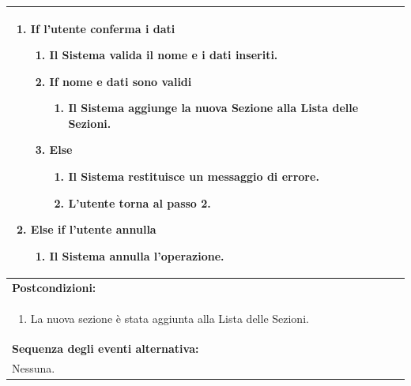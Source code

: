 \documentclass{article}
\begin{document}
\begin{table}[H]
\begin{tabular}{|p{\linewidth}|}
\begin{enumerate}
                            \item \textbf{If} l'utente conferma i dati
                            \begin{enumerate}
                                \item Il Sistema valida il nome e i dati inseriti.
                                \item \textbf{If} nome e dati sono validi
                                \begin{enumerate}
                                    \item Il Sistema aggiunge la nuova Sezione alla Lista delle Sezioni.
                                \end{enumerate}
                                \item \textbf{Else}
                                \begin{enumerate}
                                    \item Il Sistema restituisce un messaggio di errore.
                                    \item L'utente torna al passo 2.
                                \end{enumerate}
                            \end{enumerate}
                            \item \textbf{Else if} l'utente annulla
                            \begin{enumerate}
                                \item Il Sistema annulla l'operazione.
                            \end{enumerate} 
                        \end{enumerate} \\
                        \hline
                        \cellcolor{gray!20}
                        \textbf{Postcondizioni:} \\
                        \cellcolor{gray!20}
                        \begin{minipage}{\linewidth}
                            \begin{enumerate}
                                \item La nuova sezione è stata aggiunta alla Lista delle Sezioni.
                            \end{enumerate}
                        \end{minipage} \\
                        \hline
                        \textbf{Sequenza degli eventi alternativa:} \\
                        Nessuna. \\
                        \hline
                    \end{tabular}
                \end{table}
                
\end{document}
